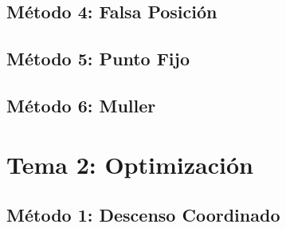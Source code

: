 \documentclass[10pt]{article}
\begin{document}
\newpage

\subsection{Método 4: Falsa Posición}
\UseRawInputEncoding


\newpage

\subsection{Método 5: Punto Fijo}
\UseRawInputEncoding


\newpage

\subsection{Método 6: Muller}
\UseRawInputEncoding


\newpage

\section{Tema 2: Optimización}

\subsection{Método 1: Descenso Coordinado}
\UseRawInputEncoding


\newpage
\end{document}
